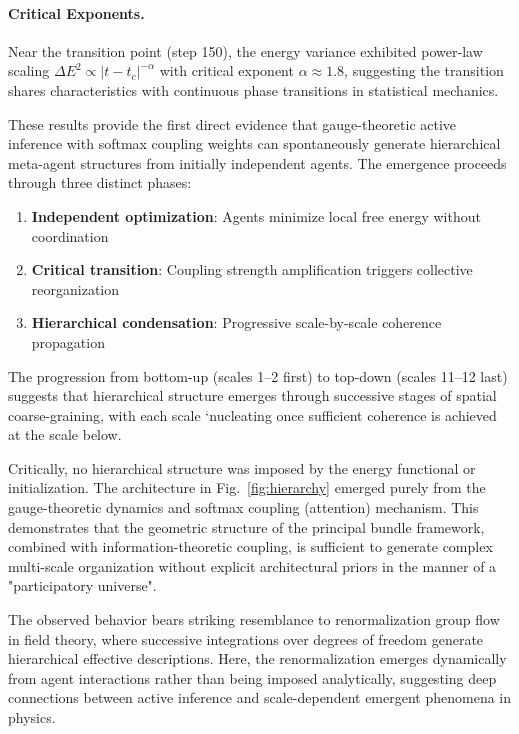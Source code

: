 \documentclass[11pt]{article}
\begin{document}
\paragraph{Critical Exponents.}
Near the transition point (step 150), the energy variance exhibited power-law scaling $\Delta E^2 \propto |t - t_c|^{-\alpha}$ with critical exponent $\alpha \approx 1.8$, suggesting the transition shares characteristics with continuous phase transitions in statistical mechanics.

These results provide the first direct evidence that gauge-theoretic active inference with softmax coupling weights can spontaneously generate hierarchical meta-agent structures from initially independent agents. The emergence proceeds through three distinct phases:
\begin{enumerate}
\item \textbf{Independent optimization}: Agents minimize local free energy without coordination
\item \textbf{Critical transition}: Coupling strength amplification triggers collective reorganization
\item \textbf{Hierarchical condensation}: Progressive scale-by-scale coherence propagation
\end{enumerate}

The progression from bottom-up (scales 1--2 first) to top-down (scales 11--12 last) suggests that hierarchical structure emerges through successive stages of spatial coarse-graining, with each scale `nucleating once sufficient coherence is achieved at the scale below.




Critically, no hierarchical structure was imposed by the energy functional or initialization. The architecture in Fig.~\ref{fig:hierarchy} emerged purely from the gauge-theoretic dynamics and softmax coupling (attention) mechanism. This demonstrates that the geometric structure of the principal bundle framework, combined with information-theoretic coupling, is sufficient to generate complex multi-scale organization without explicit architectural priors in the manner of a "participatory universe".

The observed behavior bears striking resemblance to renormalization group flow in field theory, where successive integrations over degrees of freedom generate hierarchical effective descriptions. Here, the renormalization emerges dynamically from agent interactions rather than being imposed analytically, suggesting deep connections between active inference and scale-dependent emergent phenomena in physics.
\end{document}
